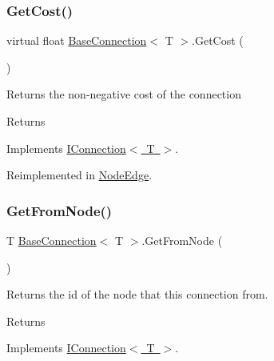 \subsubsection{\texorpdfstring{Get\+Cost()}{GetCost()}}
{\footnotesize\ttfamily virtual float \mbox{\hyperlink{class_base_connection}{Base\+Connection}}$<$ T $>$.Get\+Cost (\begin{DoxyParamCaption}{ }\end{DoxyParamCaption})\hspace{0.3cm}{\ttfamily [virtual]}}



Returns the non-\/negative cost of the connection 

\begin{DoxyReturn}{Returns}

\end{DoxyReturn}


Implements \mbox{\hyperlink{interface_i_connection_adf42d8cf17bee3b3b1ee299d6f9de1df}{I\+Connection$<$ T $>$}}.



Reimplemented in \mbox{\hyperlink{class_node_edge_aa2eb53bd74c21ecc54af55568af1b6cc}{Node\+Edge}}.

\mbox{\label{class_base_connection_a45f52b2a297e6ac3a1bca5b5b0d80b89}} 
\subsubsection{\texorpdfstring{Get\+From\+Node()}{GetFromNode()}}
{\footnotesize\ttfamily T \mbox{\hyperlink{class_base_connection}{Base\+Connection}}$<$ T $>$.Get\+From\+Node (\begin{DoxyParamCaption}{ }\end{DoxyParamCaption})}



Returns the id of the node that this connection from. 

\begin{DoxyReturn}{Returns}

\end{DoxyReturn}


Implements \mbox{\hyperlink{interface_i_connection_acecfce42b26af8f2f83e3a806edc6910}{I\+Connection$<$ T $>$}}.

\mbox{\label{class_base_connection_ad6baf1f89a5abd5f860e1ec58244aab7}} 

